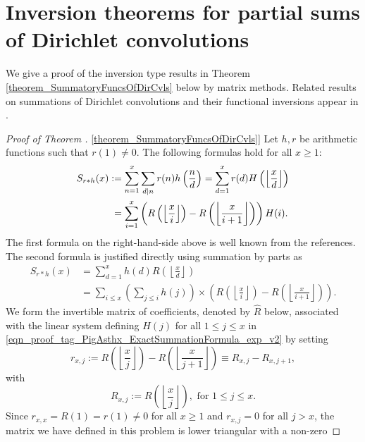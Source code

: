 \documentclass[11pt,reqno,a4letter]{article}
\newcommand{\hlocalref}[1]{\hyperref[#1]{\ref{#1}}}
\numberwithin{equation}{section}
\numberwithin{figure}{section}
\numberwithin{table}{section}
\newcommand{\cf}{\textit{cf.\ }}
\newcommand{\floor}[1]{\left\lfloor #1 \right\rfloor}
\newcommand{\Floor}[2]{\ensuremath{\left\lfloor \frac{#1}{#2} \right\rfloor}}
\theoremstyle{plain}
\numberwithin{theorem}{section}
\theoremstyle{definition}
\begin{document}
\section{Inversion theorems for partial sums of Dirichlet convolutions}
\label{Section_PrelimProofs_Config} 
\label{subSection_PrelimProofs_Config_InversionTheorem}

We give a proof of the inversion type results in 
Theorem \hlocalref{theorem_SummatoryFuncsOfDirCvls} 
below by matrix methods. 
Related results on summations of Dirichlet convolutions and their 
functional inversions appear in 
\cite[\S 2.14; \S 3.10; \S 3.12; \cf \S 4.9, p.\ 95]{APOSTOLANUMT}. 

\begin{proof}[Proof of Theorem \hlocalref{theorem_SummatoryFuncsOfDirCvls}] 
\label{proofOf_theorem_SummatoryFuncsOfDirCvls} 
Let $h,r$ be arithmetic functions such that $r(1) \neq 0$. 
The following formulas hold for all $x \geq 1$: 
\begin{align} 
\notag 
S_{r \ast h}(x) & := \sum_{n=1}^{x} \sum_{d|n} r(n) h\left(\frac{n}{d}\right) = 
     \sum_{d=1}^x r(d) H\left(\floor{\frac{x}{d}}\right) \\ 
\label{eqn_proof_tag_PigAsthx_ExactSummationFormula_exp_v2} 
     & \phantom{:} = 
     \sum_{i=1}^x \left(R\left(\floor{\frac{x}{i}}\right) - R\left(\floor{\frac{x}{i+1}}\right)\right) H(i). 
\end{align} 
The first formula on the right-hand-side above is well known from the references. 
The second formula is justified directly using 
summation by parts as \cite[\S 2.10(ii)]{NISTHB} 
\begin{align*} 
S_{r \ast h}(x) & = \sum_{d=1}^x h(d) R\left(\floor{\frac{x}{d}}\right) \\ 
     & = \sum_{i \leq x} \left(\sum_{j \leq i} h(j)\right) \times 
     \left(R\left(\floor{\frac{x}{i}}\right) - 
     R\left(\floor{\frac{x}{i+1}}\right)\right). 
\end{align*} 
We form the invertible matrix of coefficients, denoted by $\hat{R}$ below, 
associated with the linear system defining $H(j)$ for all 
$1 \leq j \leq x$ in \eqref{eqn_proof_tag_PigAsthx_ExactSummationFormula_exp_v2} by setting 
\[
r_{x,j} := R\left(\floor{\frac{x}{j}}\right) - R\left(\floor{\frac{x}{j+1}}\right) 
     \equiv R_{x,j} - R_{x,j+1}, 
\] 
with 
\[
R_{x,j} := R\left(\Floor{x}{j}\right), \text{ for } 1 \leq j \leq x. 
\]
Since $r_{x,x} = R(1) = r(1) \neq 0$ for all $x \geq 1$ and $r_{x,j} = 0$ for all $j > x$, 
the matrix we have defined in this problem is lower triangular with a non-zero 

\end{proof}
\end{document}
